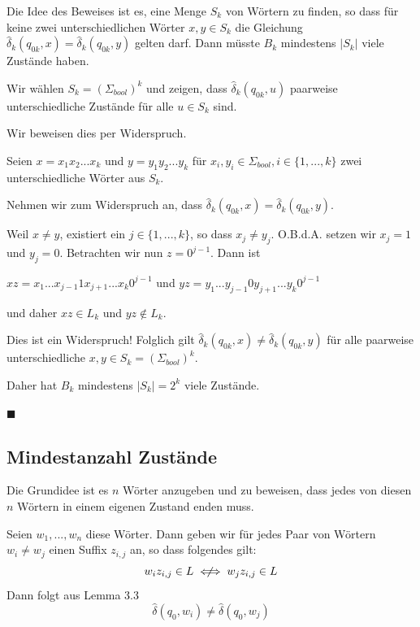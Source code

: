 \documentclass[a4paper, 11pt]{article}
\begin{document}
        Die Idee des Beweises ist es, eine Menge $S_k$ von Wörtern zu finden, so dass für keine zwei unterschiedlichen Wörter $x, y \in S_k$ die Gleichung $\hat{\delta}_k (q_{0k}, x) = \hat{\delta}_k (q_{0k}, y)$ gelten darf. 
        Dann müsste $B_k$ mindestens $|S_k|$ viele Zustände haben.
        
    
        Wir wählen $S_k = (\Sigma_{bool})^k$ und zeigen, dass $\hat{\delta}_k(q_{0k}, u)$ paarweise unterschiedliche Zustände für alle $u \in  S_k$ sind. 
    
        Wir beweisen dies per Widerspruch. 
    
        Seien $x = x_1x_2...x_k$ und $y = y_1y_2...y_k$ für $x_i,y_i \in \Sigma_{bool}, i \in \{1, ..., k\}$ zwei unterschiedliche Wörter aus $S_k$.
    
        Nehmen wir zum Widerspruch an, dass $\hat{\delta}_k(q_{0k}, x) = \hat{\delta}_k(q_{0k}, y)$.
        
    
        Weil $x \neq y$, existiert ein $j \in \{1, ...,k\}$, so dass $x_j \neq y_j$. O.B.d.A. setzen wir $x_j = 1$ und $y_j = 0$. 
        Betrachten wir nun $z = 0^{j-1}$.  Dann ist 
    
        $xz = x_1...x_{j-1}1x_{j+1}...x_k0^{j-1}$ und $yz = y_1...y_{j-1}0y_{j+1}...y_k0^{j-1}$
    
        und daher $xz \in L_k$ und $yz \notin L_k$. 
        
        Dies ist ein Widerspruch! Folglich gilt $\hat{\delta}_k(q_{0k}, x) \neq \hat{\delta}_k(q_{0k}, y)$ für alle paarweise unterschiedliche $x,y \in S_k = (\Sigma_{bool})^k$.
        
        Daher hat $B_k$ mindestens $|S_k| = 2^k$ viele Zustände.
        
        \hspace*{0pt}\hfill$\blacksquare$
    
    
    \subsection{Mindestanzahl Zustände}
    
        Die Grundidee ist es $n$ Wörter anzugeben und zu beweisen, dass jedes von diesen $n$ Wörtern in einem eigenen Zustand enden muss.
        
        Seien $w_1, ...,w_n$ diese Wörter. Dann geben wir für jedes Paar von Wörtern $w_i \neq w_j$ einen Suffix $z_{i,j}$ an, so dass folgendes gilt:
        $$w_iz_{i,j} \in L \centernot{\iff} w_jz_{i,j} \in L$$
        Dann folgt aus Lemma 3.3
        $$\hat{\delta}(q_0, w_i) \neq \hat{\delta}(q_0, w_j)$$
        
\end{document}
